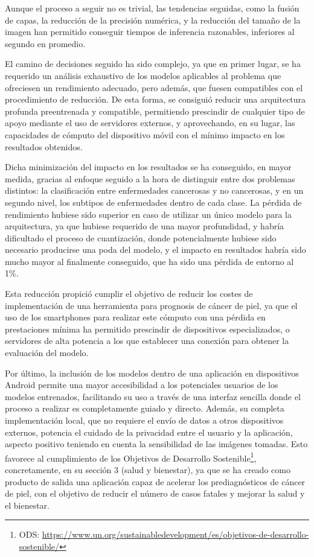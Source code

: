  Aunque el proceso a seguir no es trivial, las tendencias seguidas, como la fusión de capas, la reducción de la precisión numérica, y la reducción del tamaño de la imagen han permitido conseguir tiempos de inferencia razonables, inferiores al segundo en promedio.

 El camino de decisiones seguido ha sido complejo, ya que en primer lugar, se ha requerido un análisis exhaustivo de los modelos aplicables al problema que ofreciesen un rendimiento adecuado, pero además, que fuesen compatibles con el procedimiento de reducción. De esta forma, se consiguió reducir una arquitectura profunda preentrenada y compatible, permitiendo prescindir de cualquier tipo de apoyo mediante el uso de servidores externos, y aprovechando, en su lugar, las capacidades de cómputo del dispositivo móvil con el mínimo impacto en los resultados obtenidos.

Dicha minimización del impacto en los resultados se ha conseguido, en mayor medida, gracias al enfoque seguido a la hora de distinguir entre dos problemas distintos: la clasificación entre enfermedades cancerosas y no cancerosas, y en un segundo nivel, los subtipos de enfermedades dentro de cada clase. La pérdida de rendimiento hubiese sido superior en caso de utilizar un único modelo para la arquitectura, ya que hubiese requerido de una mayor profundidad, y habría dificultado el proceso de cuantización, donde potencialmente hubiese sido necesario producirse una poda del modelo, y el impacto en resultados habría sido mucho mayor al finalmente conseguido, que ha sido una pérdida de entorno al 1\%. 

Esta reducción propició cumplir el objetivo de reducir los costes de implementación de una herramienta para prognosis de cáncer de piel, ya que el uso de los smartphones para realizar este cómputo con una pérdida en prestaciones mínima ha permitido prescindir de dispositivos especializados, o servidores de alta potencia a los que establecer una conexión para obtener la evaluación del modelo. 

Por último, la inclusión de los modelos dentro de una aplicación en dispositivos Android permite una mayor accesibilidad a los potenciales usuarios de los modelos entrenados, facilitando su uso a través de una interfaz sencilla donde el proceso a realizar es completamente guiado y directo. Además, su completa implementación local, que no requiere el envío de datos a otros dispositivos externos, potencia el cuidado de la privacidad entre el usuario y la aplicación, aspecto positivo teniendo en cuenta la sensibilidad de las imágenes tomadas. Esto favorece al cumplimiento de los Objetivos de Desarrollo Sostenible\footnote{ODS: \url{https://www.un.org/sustainabledevelopment/es/objetivos-de-desarrollo-sostenible/}}, concretamente, en su sección 3 (salud y bienestar), ya que se ha creado como producto de salida una aplicación capaz de acelerar los prediagnósticos de cáncer de piel, con el objetivo de reducir el número de casos fatales y mejorar la salud y el bienestar.

